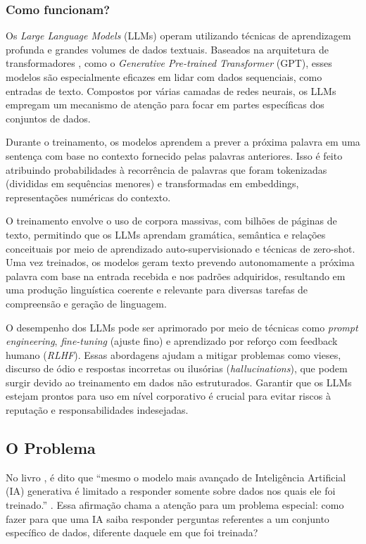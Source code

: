 \documentclass[a4paper, 12pt]{article}
\newcommand{\citeb}[1]{\bibleftbracket\cite{#1}\bibrightbracket}
\begin{document}
    \subsubsection{Como funcionam?}

    Os \textit{Large Language Models} (LLMs) operam utilizando técnicas de aprendizagem profunda e grandes volumes de dados textuais. Baseados na arquitetura de transformadores \citeb{att_all_u_need}, como o \textit{Generative Pre-trained Transformer} (GPT), esses modelos são especialmente eficazes em lidar com dados sequenciais, como entradas de texto. Compostos por várias camadas de redes neurais, os LLMs empregam um mecanismo de atenção para focar em partes específicas dos conjuntos de dados.

    Durante o treinamento, os modelos aprendem a prever a próxima palavra em uma sentença com base no contexto fornecido pelas palavras anteriores. Isso é feito atribuindo probabilidades à recorrência de palavras que foram tokenizadas (divididas em sequências menores) e transformadas em embeddings, representações numéricas do contexto.

    O treinamento envolve o uso de corpora massivas, com bilhões de páginas de texto, permitindo que os LLMs aprendam gramática, semântica e relações conceituais por meio de aprendizado auto-supervisionado e técnicas de zero-shot. Uma vez treinados, os modelos geram texto prevendo autonomamente a próxima palavra com base na entrada recebida e nos padrões adquiridos, resultando em uma produção linguística coerente e relevante para diversas tarefas de compreensão e geração de linguagem.

    O desempenho dos LLMs pode ser aprimorado por meio de técnicas como \textit{prompt engineering}, \textit{fine-tuning} (ajuste fino) e aprendizado por reforço com feedback humano (\textit{RLHF}). Essas abordagens ajudam a mitigar problemas como vieses, discurso de ódio e respostas incorretas ou ilusórias (\textit{hallucinations}), que podem surgir devido ao treinamento em dados não estruturados. Garantir que os LLMs estejam prontos para uso em nível corporativo é crucial para evitar riscos à reputação e responsabilidades indesejadas.


    \subsection{O Problema}

    No livro , é dito que ``mesmo o modelo mais avançado de Inteligência Artificial (IA) generativa é limitado a responder somente sobre dados nos quais ele foi treinado.'' \citeb{rothman}. Essa afirmação chama a atenção para um problema especial: como fazer para que uma IA saiba responder perguntas referentes a um conjunto específico de dados, diferente daquele em que foi treinada?
\end{document}
